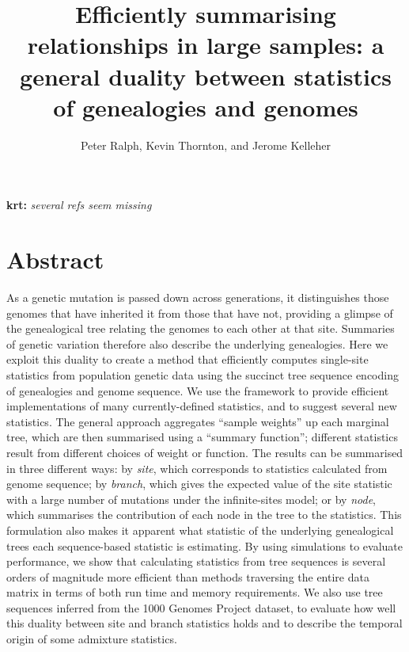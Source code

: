 \documentclass{article}
\newcommand{\krt}[1]{{\color{green}\textbf{krt:} \it #1}}
\begin{document}
\title{
    Efficiently summarising relationships in large samples:
    a general duality between statistics of genealogies and genomes}
\author{Peter Ralph, Kevin Thornton, and Jerome Kelleher}
\maketitle


\krt{several refs seem missing}


\section*{Abstract}

As a genetic mutation is passed down across generations,
it distinguishes those genomes that have inherited it from those that have not,
providing a glimpse of the genealogical tree relating the genomes to each other at that site.
Summaries of genetic variation therefore also describe the underlying genealogies.
Here we exploit this duality to create a method that efficiently computes single-site statistics
from population genetic data using the succinct tree sequence encoding
of genealogies and genome sequence.
We use the framework to provide efficient implementations of
many currently-defined statistics, and to suggest several new statistics.
The general approach aggregates ``sample weights'' up each marginal tree,
which are then summarised using a ``summary function'';
different statistics result from different choices of weight or function.
The results can be summarised in three different ways:
by \emph{site}, which corresponds to statistics calculated from genome
sequence;
by \emph{branch}, which gives the expected value of the site statistic
with a large number of mutations under the infinite-sites model;
or by \emph{node}, which summarises the contribution of each node in the tree to the statistics.
This formulation also makes it apparent what statistic of the underlying genealogical trees
each sequence-based statistic is estimating.  By using simulations to evaluate performance, we
show that calculating statistics from tree sequences is several orders of magnitude more efficient than
methods traversing the entire data matrix in terms of both run time and memory requirements.
We also use tree sequences inferred from the 1000 Genomes Project dataset,
to evaluate how well this duality between site and branch statistics holds
and to describe the temporal origin of some admixture statistics.
\end{document}
